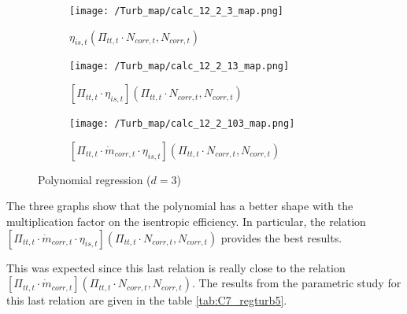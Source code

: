 \begin{figure}[H]
    \centering
    \begin{subfigure}[b]{0.4\textwidth}
        \centering
        \texttt{[image: /Turb\_map/calc\_12\_2\_3\_map.png]}
        \caption{$\eta_{is,t}(\Pi_{tt,t}\cdot N_{corr,t},N_{corr,t})$}
        \label{fig:C7_etaturbevo0}
    \end{subfigure}
    \begin{subfigure}[b]{0.4\textwidth}
        \centering
        \texttt{[image: /Turb\_map/calc\_12\_2\_13\_map.png]}
        \caption{$[\Pi_{tt,t}\cdot\eta_{is,t}](\Pi_{tt,t}\cdot N_{corr,t},N_{corr,t})$}
        \label{fig:C7_etaturbevo1}
    \end{subfigure}
    \begin{subfigure}[b]{0.4\textwidth}
        \centering
        \texttt{[image: /Turb\_map/calc\_12\_2\_103\_map.png]}
        \caption{$[\Pi_{tt,t}\cdot \dot{m}_{corr,t}\cdot\eta_{is,t}](\Pi_{tt,t}\cdot N_{corr,t},N_{corr,t})$}
        \label{fig:C7_etaturbevo2}
    \end{subfigure}
    \caption{Polynomial regression ($d=3$)} \label{fig:C7_etaturbevo}
\end{figure}
The three graphs show that the polynomial has a better shape with the multiplication factor on the isentropic efficiency. In particular, the relation $[\Pi_{tt,t}\cdot \dot{m}_{corr,t}\cdot\eta_{is,t}](\Pi_{tt,t}\cdot N_{corr,t},N_{corr,t})$ provides the best results.

This was expected since this last relation is really close to the relation $[\Pi_{tt,t}\cdot \dot{m}_{corr,t}](\Pi_{tt,t}\cdot N_{corr,t},N_{corr,t})$. The results from the parametric study for this last relation are given in the table \ref{tab:C7_regturb5}.

